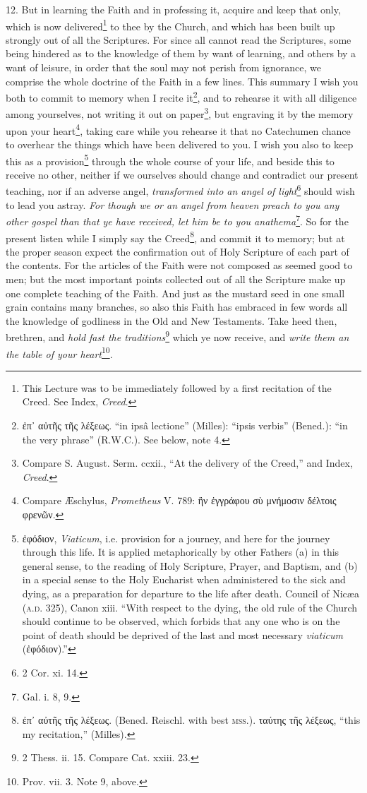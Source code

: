 12. But in learning the Faith and in professing it, acquire and keep that only, which is now delivered\footnote{This Lecture was to be immediately followed by a first recitation of the Creed. See Index, \emph{Creed}.} to thee by the Church, and which has been built up strongly out of all the Scriptures. For since all cannot read the Scriptures, some being hindered as to the knowledge of them by want of learning, and others by a want of leisure, in order that the soul may not perish from ignorance, we comprise the whole doctrine of the Faith in a few lines. This summary I wish you both to commit to memory when I recite it\footnote{\textgreek{ἐπ᾽ αὐτῆς τῆς λέξεως}. “in ipsâ lectione” (Milles): “ipsis verbis” (Bened.): “in the very phrase” (\textsc{R.W.C.}). See below, note 4.}, and to rehearse it with all diligence among yourselves, not writing it out on paper\footnote{Compare S. August. Serm. ccxii., “At the delivery of the Creed,” and Index, \emph{Creed}.}, but engraving it by the memory upon your heart\footnote{Compare Æschylus, \emph{Prometheus} V. 789: \textgreek{ἣν ἐγγράφου σὺ μνήμοσιν δέλτοις φρενῶν}.}, taking care while you rehearse it that no Catechumen chance to overhear the things which have been delivered to you. I wish you also to keep this as a provision\footnote{\textgreek{ἐφόδιον}, \emph{Viaticum}, i.e. provision for a journey, and here for the journey through this life. It is applied metaphorically by other Fathers (a) in this general sense, to the reading of Holy Scripture, Prayer, and Baptism, and (b) in a special sense to the Holy Eucharist when administered to the sick and dying, as a preparation for departure to the life after death. Council of Nicæa (\textsc{a.d.} 325), Canon xiii. “With respect to the dying, the old rule of the Church should continue to be observed, which forbids that any one who is on the point of death should be deprived of the last and most necessary \emph{viaticum} (\textgreek{ἐφόδιον}).”} through the whole course of your life, and beside this to receive no other, neither if we ourselves should change and contradict our present teaching, nor if an adverse angel, \emph{transformed into an angel of light}\footnote{2 Cor. xi. 14.} should wish to lead you astray. \emph{For though we or an angel from heaven preach to you any other gospel than that ye have received, let him be to you anathema}\footnote{Gal. i. 8, 9.}. So for the present listen while I simply say the Creed\footnote{\textgreek{ἐπ᾽ αὐτῆς τῆς λέξεως}. (Bened. Reischl. with best \textsc{mss.}). \textgreek{ταύτης τῆς λέξεως}, “this my recitation,” (Milles).}, and commit it to memory; but at the proper season expect the confirmation out of Holy Scripture of each part of the contents. For the articles of the Faith were not composed as seemed good to men; but the most important points collected out of all the Scripture make up one complete teaching of the Faith. And just as the mustard seed in one small grain contains many branches, so also this Faith has embraced in few words all the knowledge of godliness in the Old and New Testaments. Take heed then, brethren, and \emph{hold fast the traditions}\footnote{2 Thess. ii. 15. Compare Cat. xxiii. 23.} which ye now receive, and \emph{write them an the table of your heart}\footnote{Prov. vii. 3. Note 9, above.}.

